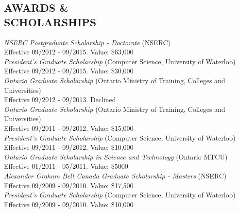 \documentclass[line,margin]{res}
\begin{document}
\begin{resume}
\section{AWARDS \& \\ SCHOLARSHIPS}
{\sl NSERC Postgraduate Scholarship - Doctorate} (NSERC) \\
\hspace*{1cm} Effective 09/2012 - 09/2015. Value: \$63,000 \vspace{3pt} \\
{\sl President's Graduate Scholarship} (Computer Science, University of Waterloo) \\
\hspace*{1cm} Effective 09/2012 - 09/2015. Value: \$30,000 \vspace{3pt} \\
{\sl Ontario Graduate Scholarship} (Ontario Ministry of Training, Colleges and Universities) \\ 
\hspace*{1cm} Effective 09/2012 - 09/2013. Declined \vspace{3pt} \\
{\sl Ontario Graduate Scholarship} (Ontario Ministry of Training, Colleges and Universities) \\ 
\hspace*{1cm} Effective 09/2011 - 09/2012. Value: \$15,000 \vspace{3pt} \\
{\sl President's Graduate Scholarship} (Computer Science, University of Waterloo) \\
\hspace*{1cm} Effective 09/2011 - 09/2012. Value: \$10,000 \vspace{3pt} \\
{\sl Ontario Graduate Scholarship in Science and Technology} (Ontario MTCU) \\ 
\hspace*{1cm} Effective 01/2011 - 05/2011. Value: \$5000 \vspace{3pt} \\
{\sl Alexander Graham Bell Canada Graduate Scholarship - Masters} (NSERC) \\ 
\hspace*{1cm} Effective 09/2009 - 09/2010. Value: \$17,500 \vspace{3pt} \\
{\sl President's Graduate Scholarship} (Computer Science, University of Waterloo) \\
\hspace*{1cm} Effective 09/2009 - 09/2010. Value: \$10,000 \vspace{3pt} \\

\end{resume}
\end{document}
